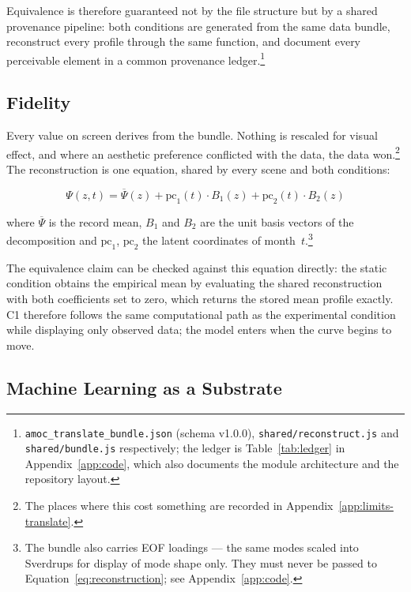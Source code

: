 Equivalence is therefore guaranteed not by the file structure but by a shared provenance pipeline: both conditions are generated from the same data bundle, reconstruct every profile through the same function, and document every perceivable element in a common provenance ledger.\footnote{\texttt{amoc\_translate\_bundle.json} (schema v1.0.0), \texttt{shared/reconstruct.js} and \texttt{shared/bundle.js} respectively; the ledger is Table~\ref{tab:ledger} in Appendix~\ref{app:code}, which also documents the module architecture and the repository layout.}

\subsection{Fidelity}
\label{subsec:fidelity}

Every value on screen derives from the bundle. Nothing is rescaled for visual effect, and where an aesthetic preference conflicted with the data, the data won.\footnote{The places where this cost something are recorded in Appendix~\ref{app:limits-translate}.} The reconstruction is one equation, shared by every scene and both conditions:

\begin{equation}
\label{eq:reconstruction}
\Psi(z, t) = \overline{\Psi}(z) + \mathrm{pc}_1(t) \cdot B_1(z) + \mathrm{pc}_2(t) \cdot B_2(z)
\end{equation}

where $\overline{\Psi}$ is the record mean, $B_1$ and $B_2$ are the unit basis vectors of the decomposition and $\mathrm{pc}_1$, $\mathrm{pc}_2$ the latent coordinates of month~$t$.\footnote{The bundle also carries EOF loadings --- the same modes scaled into Sverdrups for display of mode shape only. They must never be passed to Equation~\ref{eq:reconstruction}; see Appendix~\ref{app:code}.}

The equivalence claim can be checked against this equation directly: the static condition obtains the empirical mean by evaluating the shared reconstruction with both coefficients set to zero, which returns the stored mean profile exactly. C1 therefore follows the same computational path as the experimental condition while displaying only observed data; the model enters when the curve begins to move.

\subsection{Machine Learning as a Substrate}
\label{subsec:ml-role}

